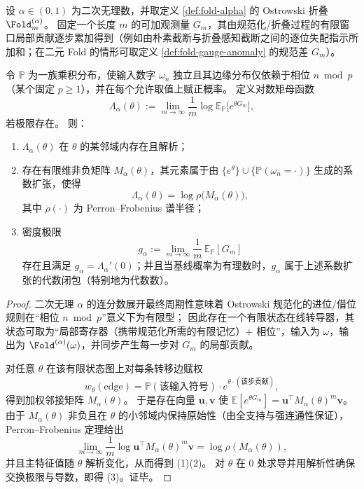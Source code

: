 \begin{theorem}\label{thm:ostrowski-quadratic-irrational-pressure-matrix-algebraicity}
设 \(\alpha\in(0,1)\) 为二次无理数，并取定义 \ref{def:fold-alpha} 的 Ostrowski 折叠 \(\Fold_m^{(\alpha)}\)。
固定一个长度 \(m\) 的可加观测量 \(G_m\)，其由规范化/折叠过程的有限窗口局部贡献逐步累加得到（例如由朴素截断与折叠感知截断之间的逐位失配指示所加和；在二元 Fold 的情形可取定义 \ref{def:fold-gauge-anomaly} 的规范差 \(G_m\)）。
\par
令 \(\mathbb P\) 为一族乘积分布，使输入数字 \(\omega_n\) 独立且其边缘分布仅依赖于相位 \(n\bmod p\)（某个固定 \(p\ge 1\)），并在每个允许取值上赋正概率。
定义对数矩母函数
\[
\Lambda_\alpha(\theta):=\lim_{m\to\infty}\frac1m\log \mathbb E_{\mathbb P}\!\big[e^{\theta G_m}\big],
\]
若极限存在。
则：
\begin{enumerate}
  \item \(\Lambda_\alpha(\theta)\) 在 \(\theta\) 的某邻域内存在且解析；
  \item 存在有限维非负矩阵 \(M_\alpha(\theta)\)，其元素属于由
  \(\{e^\theta\}\cup\{\mathbb P(\omega_n=\cdot)\}\) 生成的系数扩张，使得
  \[
  \Lambda_\alpha(\theta)=\log \rho\bigl(M_\alpha(\theta)\bigr),
  \]
  其中 \(\rho(\cdot)\) 为 Perron--Frobenius 谱半径；
  \item 密度极限
  \[
  g_\alpha:=\lim_{m\to\infty}\frac1m\,\mathbb E_{\mathbb P}[G_m]
  \]
  存在且满足 \(g_\alpha=\Lambda_\alpha'(0)\)；并且当基线概率为有理数时，\(g_\alpha\) 属于上述系数扩张的代数闭包（特别地为代数数）。
\end{enumerate}
\end{theorem}
\begin{proof}
二次无理 \(\alpha\) 的连分数展开最终周期性意味着 Ostrowski 规范化的进位/借位规则在“相位 \(n\bmod p\)”意义下为有限型；
因此存在一个有限状态在线转导器，其状态可取为“局部寄存器（携带规范化所需的有限记忆）\(+\) 相位”，输入为 \(\omega\)，输出为 \(\Fold^{(\alpha)}(\omega)\)，并同步产生每一步对 \(G_m\) 的局部贡献。
\par
对任意 \(\theta\) 在该有限状态图上对每条转移边赋权
\[
w_\theta(\text{edge})
=\mathbb P(\text{该输入符号})\cdot e^{\theta\cdot(\text{该步贡献})},
\]
得到加权邻接矩阵 \(M_\alpha(\theta)\)。
于是存在向量 \(\mathbf u,\mathbf v\) 使
\(
\mathbb E[e^{\theta G_m}]=\mathbf u^\top M_\alpha(\theta)^m\mathbf v
\)。
由于 \(M_\alpha(\theta)\) 非负且在 \(\theta\) 的小邻域内保持原始性（由全支持与强连通性保证），Perron--Frobenius 定理给出
\[
\lim_{m\to\infty}\frac1m\log \mathbf u^\top M_\alpha(\theta)^m\mathbf v=\log\rho(M_\alpha(\theta)),
\]
并且主特征值随 \(\theta\) 解析变化，从而得到 (1)(2)。
对 \(\theta\) 在 \(0\) 处求导并用解析性确保交换极限与导数，即得 (3)。证毕。
\end{proof}
